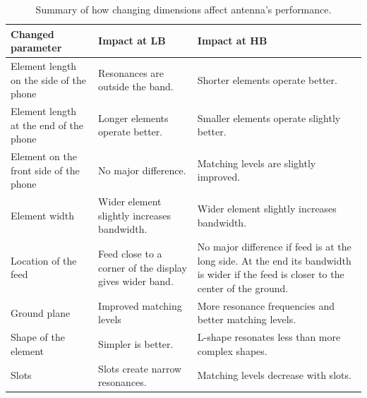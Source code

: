 \begin{table}[H]
    \centering
    \caption{Summary of how changing dimensions affect antenna's performance.}
    \label{tab:dimension_summary}
    \begin{tabular}{|p{}|p{}|p{}|}
        \hline
        \textbf{Changed parameter} & \textbf{Impact at LB} & \textbf{Impact at HB}\\
        \hline
        Element length on the side of the phone & Resonances are outside the band. & Shorter elements operate better.\\
        \hline
        Element length at the end of the phone & Longer elements operate better. & Smaller elements operate slightly better.\\
        \hline
        Element on the front side of the phone & No major difference. & Matching levels are slightly improved.\\
        \hline
        Element width & Wider element slightly increases bandwidth. & Wider element slightly increases bandwidth.\\
        \hline
        Location of the feed & Feed close to a corner of the display gives wider band. & No major difference if feed is at the long side. At the end its bandwidth is wider if the feed is closer to the center of the ground.\\
        \hline
        Ground plane & Improved matching levels & More resonance frequencies and better matching levels.\\
        \hline
        Shape of the element & Simpler is better. & L-shape resonates less than more complex shapes.\\
        \hline
        Slots & Slots create narrow resonances. & Matching levels decrease with slots.\\
        \hline
    \end{tabular}
\end{table} 

\clearpage
